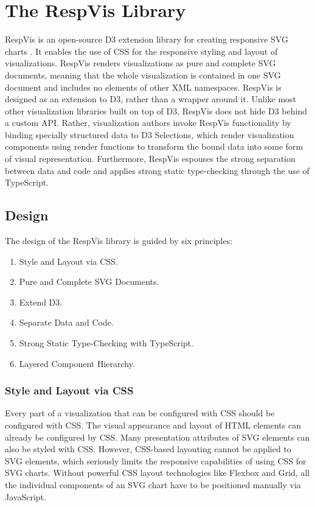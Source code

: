 
\chapter{The RespVis Library}
\label{chap:RespVis}

RespVis is an open-source D3 extension library for creating responsive
SVG charts \parencite{RespVisGitHub,RespVisLive}. It enables the use
of CSS for the responsive styling and layout of
visualizations. RespVis renders visualizations as pure and complete
SVG documents, meaning that the whole visualization is contained in
one SVG document and includes no elements of other XML namespaces.
RespVis is designed as an extension to D3, rather than a wrapper
around it. Unlike most other visualization libraries built on top of
D3, RespVis does not hide D3 behind a custom API. Rather,
visualization authors invoke RespVis functionality by binding
specially structured data to D3 Selections, which render visualization
components using render functions to transform the bound data into
some form of visual representation. Furthermore, RespVis espouses the
strong separation between data and code and applies strong static
type-checking through the use of TypeScript.






\section{Design}
\label{sec:Design}

The design of the RespVis library is guided by six principles:
\begin{enumerate}
\item Style and Layout via CSS.
\item Pure and Complete SVG Documents.
\item Extend D3.
\item Separate Data and Code.
\item Strong Static Type-Checking with TypeScript.
\item Layered Component Hierarchy.
\end{enumerate}




\subsection{Style and Layout via CSS}

Every part of a visualization that can be configured with CSS should
be configured with CSS. The visual appearance and layout of HTML
elements can already be configured by CSS. Many presentation
attributes of SVG elements can also be styled with CSS. However,
CSS-based layouting cannot be applied to SVG elements, which seriously
limits the responsive capabilities of using CSS for SVG charts.
Without powerful CSS layout technologies like Flexbox and Grid, all
the individual components of an SVG chart have to be positioned
manually via JavaScript.

